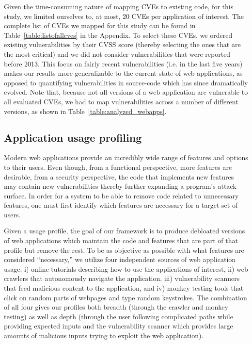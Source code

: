Given the time-consuming nature of mapping CVEs to existing code, for
this study, we limited ourselves to, at most, 20 CVEs per application
of interest.
The complete list of CVEs we mapped for this study can be found in
Table~\ref{table:listofallcves} in the Appendix.
To select these CVEs, we ordered existing vulnerabilities by
their CVSS score (thereby selecting the ones that are the most critical)
and we did not consider vulnerabilities that were reported before 2013. This
focus on fairly recent vulnerabilities (i.e. in the last five years) makes
our results more generalizable to the current state of web applications,
as opposed to quantifying vulnerabilities in source-code which has since
dramatically evolved. Note that, because not all versions of a web application
are vulnerable to all evaluated CVEs, we had to map vulnerabilities
across a number of different versions, as shown in
Table~\ref{table:analyzed_webapps}.



\subsection{Application usage profiling}
\label{subsec:profiling}

Modern web applications provide an incredibly wide range of features and
options to their users. Even though, from a functional perspective, more
features are desirable, from a security perspective, the code that implements
new features may contain new vulnerabilities thereby further expanding
a program's attack surface. In order for a system to be
able to remove code related to unnecessary features, one must first identify
which features are necessary for a target set of users.

Given a usage profile, the goal of our framework is to produce debloated
versions of web applications which maintain the code and features that are
part of that profile but remove the rest. To be as objective as possible with
what features are considered ``necessary,'' we utilize four independent
sources of web application usage: i) online tutorials describing how to use
the applications of interest, ii) web crawlers that autonomously navigate
the application, iii) vulnerability scanners that feed malicious content to the
application, and iv) monkey testing tools that click on random parts of webpages
and type random keystrokes. The combination of all four gives our profiles
both breadth (through the crawler and monkey testing) as well as depth (through
the user following complicated paths while providing expected inputs and the
vulnerability scanner which provides large amounts of malicious inputs trying
to exploit the web application).

